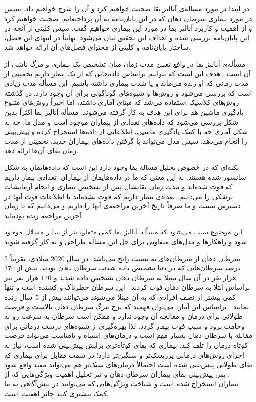 


در ابتدا در مورد مسأله‌ی آنالیز بقا صحبت خواهیم کرد و آن را شرح خواهیم داد. سپس در مورد بیماری سرطان دهان که در این پایان‌نامه به آن پرداخته‌ایم، صحبت خواهیم کرد و از اهمیت و کاربرد آنالیز بقا در مورد این بیماری خواهیم گفت. سپس کلیتی از آنچه در این پایان‌نامه بررسی شده و اهداف این تحقیق بیان می‌شود. نهایتاً در انتهای این فصل، ساختار پایان‌نامه و کلیتی از محتوای فصل‌های آن ارائه خواهد شد.



مسأله‌ی آنالیز بقا در واقع تعیین مدت زمان میان تشخیص یک بیماری و مرگ ناشی از آن است . هدف این است که بتوانیم براساس داده‌هایی که از یک بیمار داریم تخمینی از مدت زمانی که او زنده می‌ماند و یا شدت بیماری داشته باشیم. این مسأله مدت زیادی است که بررسی می‌شود و روش‌ها و شیوه‌های گوناگونی برای آن وجود دارد. در گذشته روش‌های کلاسیک استفاده می‌شد که مبنای آماری داشتد، اما اخیراً روش‌های متنوع یادگیری ماشین هم برای این هدف به کار گرفته می‌شوند. مسأله آنالیز بقا اکثراً بدین شکل بررسی می‌شود که داده‌های تعدادی از بیماران موجود است و مدل ما، چه به شکل آماری چه با کمک یادگیری ماشین، اطلاعاتی از داده‌ها استخراج کرده و پیش‌بینی را انجام می‌دهد. سپس مدل می‌تواند با گرفتن داده‌های بیماران جدید، تخمینی از مدت زمان بقای آن‌ها ارائه دهد.

نکته‌ای که در خصوص تحلیل مسأله بقا وجود دارد این است که داده‌هایمان به شکل سانسور شده هستند. به این معنی که ما در داده‌هایمان از بیماران:
تعدادی بیمار داریم که فوت شده‌اند و مدت زمان بقایشان پس از تشخیص بیماری و انجام آزمایشات پزشکی را می‌دانیم.
تعدادی بیمار داریم که فوت نشده‌اند یا اطلاعات فوت آنها در دسترس نیست و ما صرفاً تاریخ آخرین مراجعه‌ی آنها را داریم و می‌دانیم که تا زمان آخرین مراجعه زنده بوده‌اند.

این موضوع سبب می‌شود که مسأله آنالیز بقا کمی متفاوت‌تر از سایر مسائل موجود شود و راهکارها و مدل‌های متفاوتی برای حل این مسأله طراحی و به کار گرفته شوند. 


سرطان دهان از سرطان‌های به نسبت رایج می‌باشد. در سال $2020$ میلادی، تقریباً $2$ درصد سرطان‌هایی که در دنیا تشخیص داده شدند، سرطان دهان بودند. بیش از $370$ هزار نفر در آن سال مبتلا به سرطان دهان تشخیص داده شدند و $170$ هزار نفر نیز براساس ابتلا به سرطان دهان فوت کردند . این سرطان خطرناک و کشنده است و تنها کمی بیشتر از نصف افرادی که به آن مبتلا می‌شوند می‌توانند بیش از $5$~سال زنده بمانند . براساس این آمار، می‌توان فهمید که نرخ مرگ سرطان دهان بالاست و  فرصت طولانی برای درمان و معالجه آن وجود ندارد و ممکن است سرطان به سرعت رو به وخامت برود و سبب فوت بیمار گردد. لذا بهره‌گیری از شیوه‌های درست درمانی برای مقابله با سرطان دهان بسیار مهم است و درمان‌های اشتباه و نامناسب می‌تواند فرصت کوتاه درمان را تلف کند. بیماری که بقای کوتاه‌تری برایش پیش‌بینی شده است، نیاز به اجرای روش‌های درمانی پرریسک‌تر و سنگین‌تر دارد؛ در سمت مقابل برای بیماری که بقای طولانی پیش‌بینی شده است احتمالاً درمان‌های سبک‌تر هم می‌تواند مفید واقع شود . پس پیش‌بینی بقای بیماران سرطان دهان و نیز تحلیل اهمیت ویژگی‌هایی که از بیماران استخراج شده است و شناخت ویژگی‌هایی که می‌توانند در پیش‌‌آگاهی به ما کمک بیشتری کنند حائز اهمیت است.


